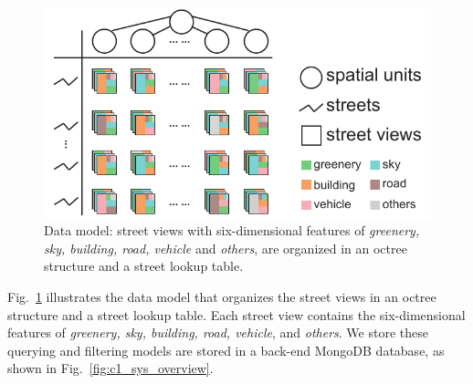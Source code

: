 \begin{figure}[t]
	\centering
	\includegraphics[width=0.8\columnwidth]{figure/streetvizor/fig4_data_model/data_model}
	\vspace{-3mm}
	\caption{Data model: street views with six-dimensional features of \textit{greenery, sky, building, road, vehicle} and \textit{others}, are organized in an octree structure and a street lookup table.}
	\vspace{-5mm}
	\label{fig:c1_data_model}
\end{figure}

\vspace*{-2mm}
Fig.~\ref{fig:c1_data_model} illustrates the data model that organizes the street views in an octree structure and a street lookup table.
Each street view contains the six-dimensional features of \textit{greenery, sky, building, road, vehicle}, and \textit{others}.
We store these querying and filtering models are stored in a back-end MongoDB database, as shown in Fig.~\ref{fig:c1_sys_overview}.
